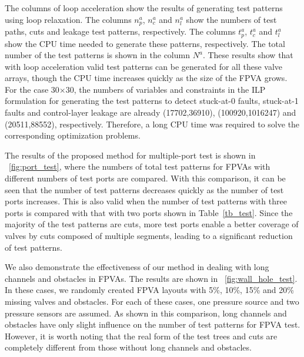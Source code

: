 \documentclass[journal,twoside]{IEEEtran}
\begin{document}
The columns of loop acceleration show the results of generating test patterns using
loop relaxation. The columns $n^a_p$, $n^a_c$ and $n^a_l$ show the
numbers of test paths, cuts and leakage test patterns,
respectively.
The columns $t^a_p$, $t^a_c$ and $t^a_l$
show the CPU time needed to generate these patterns, respectively. The total number
of the test patterns is
shown in the column $N^a$. These results show that with loop acceleration 
valid test patterns can be generated for all these valve arrays, though the CPU
time increases quickly as the size of the FPVA grows.
For the case 30$\times$30, 
the numbers of variables and constraints 
in the ILP formulation
for generating the test patterns to detect stuck-at-0 faults, 
stuck-at-1 faults and control-layer leakage are already (17702,36910), 
(100920,1016247) and (20511,88552), respectively. 
Therefore, a long CPU time
was required to solve the corresponding optimization problems.

The results of the proposed method for multiple-port test is shown in
\figname~\ref{fig:port_test}, where 
the numbers of total test patterns for FPVAs with different numbers of test ports
are compared. 
With this comparison, it can be seen that the number of test
patterns decreases quickly as the number of test ports increases. 
This is also valid when the number of test patterns with three ports is compared
with that with two ports shown in Table~\ref{tb_test}.
Since the majority of the test patterns are cuts,
more test ports enable a better coverage of valves by cuts composed of multiple
segments,
leading to a significant reduction of test patterns.

We also 
demonstrate the effectiveness of our method in dealing with long channels
and obstacles in FPVAs. The results are shown in
\figname~\ref{fig:wall_hole_test}. In these cases, we randomly
created FPVA layouts with 5\%, 10\%, 15\% and 20\% missing valves and
obstacles. For each of these cases, one pressure source and two pressure sensors are 
assumed.
As shown in this comparison, long channels and obstacles 
have only slight influence on the number of test patterns for FPVA test.
However, it is worth noting that the real form of the test trees and cuts are
completely different from those without long channels and obstacles. 
\end{document}
